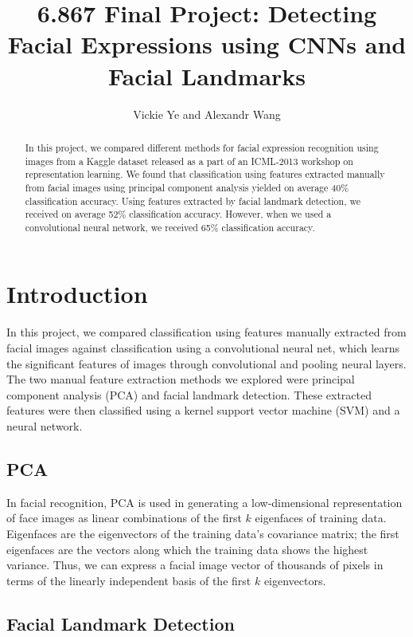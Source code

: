 \documentclass[11pt, twocolumn, twoside]{article}
\title{6.867 Final Project: Detecting Facial Expressions using CNNs and Facial Landmarks} %
\date{}
\author {Vickie Ye and Alexandr Wang}
\begin{document}
\maketitle


\begin{abstract}
In this project, we compared different methods for facial expression recognition
using images from a Kaggle dataset released as a part of an ICML-2013 workshop
on representation learning.
We found that classification using features extracted manually from facial images
using principal component analysis yielded on average 40\% classification accuracy.
Using features extracted by facial landmark detection, we received on average 52\%
classification accuracy. However, when we used a convolutional neural network, we
received 65\% classification accuracy.
\end{abstract}

\section{Introduction}

In this project, we compared classification using features manually extracted from
facial images against classification using a convolutional neural net, which learns
the significant features of images through convolutional and pooling neural layers.
The two manual feature extraction methods we explored were principal component
analysis (PCA) and facial landmark detection. These extracted features were then
classified using a kernel support vector machine (SVM) and a neural network.

\subsection{PCA}

In facial recognition, PCA is used in generating a low-dimensional representation of
face images as linear combinations of the first $k$ eigenfaces of training data.
Eigenfaces are the eigenvectors of the training data's covariance matrix; the first
eigenfaces are the vectors along which the training data shows the highest variance.
Thus, we can express a facial image vector of thousands of pixels in terms of
the linearly independent basis of the first $k$ eigenvectors. 

\subsection{Facial Landmark Detection}
\end{document}
